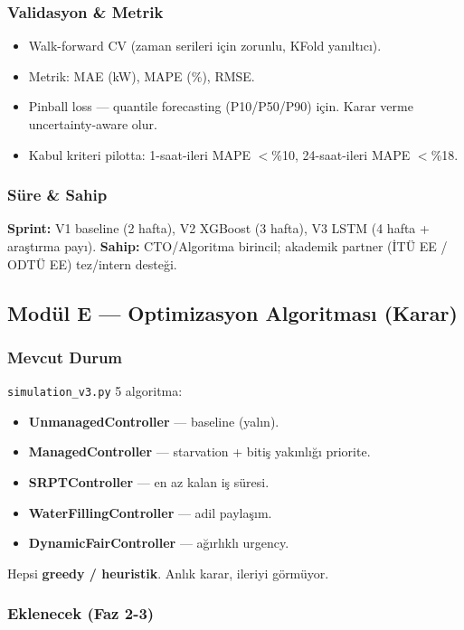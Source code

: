 \documentclass[11pt,a4paper]{article}
\begin{document}
\subsubsection{Validasyon \& Metrik}
\begin{itemize}
    \item Walk-forward CV (zaman serileri için zorunlu, KFold yanıltıcı).
    \item Metrik: MAE (kW), MAPE (\%), RMSE.
    \item Pinball loss --- quantile forecasting (P10/P50/P90) için. Karar verme uncertainty-aware olur.
    \item Kabul kriteri pilotta: 1-saat-ileri MAPE $<$\%10, 24-saat-ileri MAPE $<$\%18.
\end{itemize}

\subsubsection{Süre \& Sahip}
\textbf{Sprint:} V1 baseline (2 hafta), V2 XGBoost (3 hafta), V3 LSTM (4 hafta + araştırma payı). \textbf{Sahip:} CTO/Algoritma birincil; akademik partner (İTÜ EE / ODTÜ EE) tez/intern desteği.

\subsection{Modül E — Optimizasyon Algoritması (Karar)}

\subsubsection{Mevcut Durum}
\texttt{simulation\_v3.py} 5 algoritma:
\begin{itemize}
    \item \textbf{UnmanagedController} --- baseline (yalın).
    \item \textbf{ManagedController} --- starvation + bitiş yakınlığı priorite.
    \item \textbf{SRPTController} --- en az kalan iş süresi.
    \item \textbf{WaterFillingController} --- adil paylaşım.
    \item \textbf{DynamicFairController} --- ağırlıklı urgency.
\end{itemize}
Hepsi \textbf{greedy / heuristik}. Anlık karar, ileriyi görmüyor.

\subsubsection{Eklenecek (Faz 2-3)}
\end{document}
